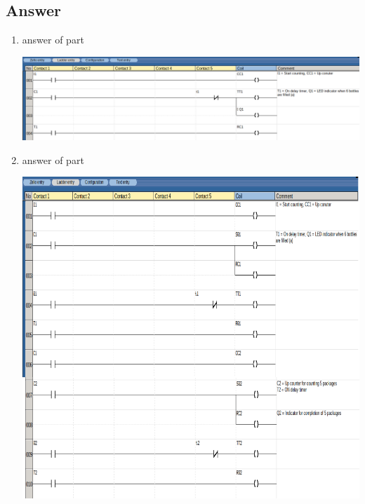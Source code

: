 \documentclass[
	12pt, %
]{fphw}
\begin{document}
 \subsection*{Answer}
 \begin{enumerate}
   \item answer of  part
   \begin{center}
   \includegraphics[width=150mm, scale=0.90]{prg17a.png}
   \end{center}
   \item answer of  part
   \begin{center}
   \includegraphics[width=150mm, scale=0.90]{prg20.png}
   \end{center}
  \end{enumerate}
\end{document}
